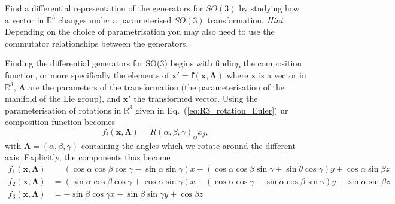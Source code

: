 \documentclass[notes.tex]{subfiles}
\begin{document}
\begin{Exercise}[difficulty={2},label=ex:SO3_diff_generators]
Find a differential representation of the generators for $SO(3)$ by studying how a vector in $\mathbb R^3$ changes under a parameterised $SO(3)$ transformation. {\it Hint}: Depending on the choice of parametrisation you may also need to use the commutator relationships between the generators.
\end{Exercise}
\begin{Answer}
Finding the differential generators for SO(3) begins with finding the composition function, or more specifically the elements of $\mathbf  x'=\mathbf f(\mathbf x, \boldsymbol \Lambda)$ where $\mathbf x$ is a vector in $\mathbb{R}^3$, $\boldsymbol \Lambda$ are the parameters of the transformation (the parameterisation of the manifold of the Lie group), and $\mathbf  x'$ the transformed vector. Using the parameterisation of rotations in $\mathbb{R}^3$ given in Eq.~(\ref{eq:R3_rotation_Euler}) ur composition function becomes 
$$f_i(\mathbf  x,\boldsymbol \Lambda) = R(\alpha,\beta,\gamma)_{ij} x_j,$$ 
with $\boldsymbol\Lambda= (\alpha,\beta,\gamma)$ containing the angles which we rotate around the different axis. Explicitly, the components thus become
\begin{align}
f_1(\mathbf  x,\boldsymbol \Lambda) &= (\cos\alpha\cos\beta\cos\gamma - \sin\alpha\sin\gamma)x - (\cos\alpha\cos\beta\sin\gamma+\sin\theta\cos\gamma)y + \cos\alpha\sin\beta z \\
f_2(\mathbf  x,\boldsymbol\Lambda) &= (\sin\alpha\cos\beta\cos\gamma + \cos\alpha\sin\gamma)x + (\cos\alpha\cos\gamma-\sin\alpha\cos\beta\sin\gamma)y + \sin\alpha\sin\beta z\\
f_3(\mathbf  x,\boldsymbol\Lambda) &= -\sin\beta\cos\gamma x + \sin\beta\sin\gamma y + \cos\beta z
\end{align}


\end{Answer}
\end{document}
